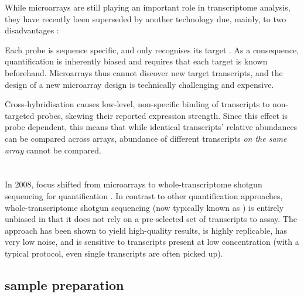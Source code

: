 While microarrays are still playing an important role in transcriptome analysis,
they have recently been superseded by another technology due, mainly, to two
disadvantages \citep{Casneuf:2007,Marioni:2008}:
\begin{enumerate*}
    \item Each probe is sequence specific, and only recognises its target \mrna.
        As a consequence, quantification is inherently biased and requires that
        each target is known beforehand. Microarrays thus cannot discover new
        target transcripts, and the design of a new microarray design is
        technically challenging and expensive.
    \item Cross-hybridisation causes low-level, non-specific binding of
        transcripts to non-targeted probes, skewing their reported expression
        strength. Since this effect is probe dependent, this means that
        while identical transcripts’ relative abundances can be compared across
        arrays, abundance of different transcripts \emph{on the same array}
        cannot be compared.
\end{enumerate*}

\section{}

In 2008, focus shifted from microarrays to whole-transcriptome shotgun
sequencing for \rna quantification \citep{Mortazavi:2008,Marioni:2008}. In
contrast to other \rna quantification approaches, whole-transcriptome shotgun
sequencing (now typically known as \rnaseq) is entirely unbiased in that it does
not rely on a pre-selected set of transcripts to assay. The approach has been
shown to yield high-quality results, is highly replicable, has very low noise,
and is sensitive to transcripts present at low concentration (with a typical
protocol, even single transcripts are often picked up).

\subsection{ sample preparation}

